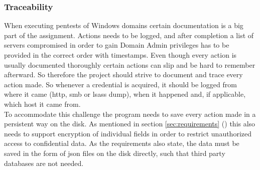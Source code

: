 \documentclass{article}
\begin{document}
\subsubsection{Traceability}
When executing pentests of Windows domains certain documentation is a big part of the assignment. Actions needs to be logged, and after completion a list of servers compromised in order to gain Domain Admin privileges has to be provided in the correct order with timestamps. Even though every action is usually documented thoroughly certain actions can slip and be hard to remember afterward. So therefore the project should strive to document and trace every action made. So whenever a credential is acquired, it should be logged from where it came (\gls{http}, \gls{smb} or \gls{lsass} dump), when it happened and, if applicable, which host it came from.\\
To accommodate this challenge the program needs to save every action made in a persistent way on the disk. As mentioned in section \ref{sec:requirements} () this also needs to support encryption of individual fields in order to restrict unauthorized access to confidential data. As the requirements also state, the data must be saved in the form of \gls{json} files on the disk directly, such that third party databases are not needed.
\end{document}
